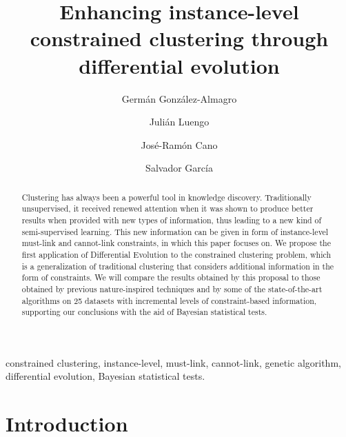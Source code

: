 \documentclass[review]{elsarticle}
\begin{document}
\begin{frontmatter}

\title{Enhancing instance-level constrained clustering through differential evolution}

\author[mymainaddress]{Germ\'an Gonz\'alez-Almagro}

\author[mymainaddress]{Juli\'an Luengo}

\author[mysecondaddress]{Jos\'e-Ram\'on Cano}

\author[mymainaddress]{Salvador Garc\'ia}

\address[mymainaddress]{DaSCI Andalusian Institute of Data Science and Computational Intelligence, University of Granada, Spain}

\address[mysecondaddress]{Dept. of Computer Science, EPS of Linares, University of Ja\'en, Campus Cient\'ifico Tecnol\'ogico de Linares, Cintur\'on Sur S/N, Linares 23700, Ja\'en, Spain}

\begin{abstract}
Clustering has always been a powerful tool in knowledge discovery. Traditionally unsupervised, it received renewed attention when it was shown to produce better results when provided with new types of information, thus leading to a new kind of semi-supervised learning. This new information can be given in form of instance-level must-link and cannot-link constraints, in which this paper focuses on. We propose the first application of Differential Evolution to the constrained clustering problem, which is a generalization of traditional clustering that considers additional information in the form of constraints. We will compare the results obtained by this proposal to those obtained by previous nature-inspired techniques and by some of the state-of-the-art algorithms on 25 datasets with incremental levels of constraint-based information, supporting our conclusions with the aid of Bayesian statistical tests.
\end{abstract}

\begin{keyword}
constrained clustering, instance-level, must-link, cannot-link, genetic algorithm, differential evolution, Bayesian statistical tests.
\end{keyword}

\end{frontmatter}

\linenumbers

\section{Introduction} \label{sec:Intro}
\end{document}

